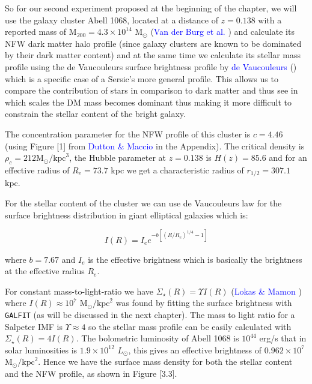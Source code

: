 So for our second experiment proposed at the beginning of the chapter, we will use the galaxy cluster Abell 1068, located at a distance of $z=0.138$ with a reported mass of $\text{M}_{200}=4.3\times 10^{14}$ $\text{M}_{\odot}$ (\textcolor{blue}{Van der Burg et al.} \citeyear{Reference2}) and calculate its NFW dark matter halo profile (since galaxy clusters are known to be dominated by their dark matter content) and at the same time we calculate its stellar mass profile using the de Vaucouleurs surface brightness profile by \textcolor{blue}{de Vaucouleurs} (\citeyear{Reference32}) which is a specific case of a Sersic's more general profile. This allows us to compare the contribution of stars in comparison to dark matter and thus see in which scales the DM mass becomes dominant thus making it more difficult to constrain the stellar content of the bright galaxy.

The concentration parameter for the NFW profile of this cluster is $c=4.46$ (using Figure [1] from \textcolor{blue}{Dutton \& Maccio} \citeyear{Reference23} in the Appendix). The critical density is $\rho_{c}=212\text{M}_{\odot}/\text{kpc}^{3}$, the Hubble parameter at $z=0.138$ is $H(z)=85.6$ and for an effective radius of $R_{e}=73.7$ kpc we get a characteristic radius of $r_{1/2}=307.1$ kpc.

For the stellar content of the cluster we can use de Vaucouleurs law for the surface brightness distribution in giant elliptical galaxies which is:

\begin{equation}
I(R)=I_{e}e^{-b\left[\left(R/R_{e}\right)^{1/4}-1\right]}
\end{equation}

where $b=7.67$ and $I_{e}$ is the effective brightness which is basically the brightness at the effective radius $R_{e}$.

For constant mass-to-light-ratio we have $\Sigma_{\star}(R)= \Upsilon I(R)$ (\textcolor{blue}{Lokas \& Mamon} \citeyear{Reference14}) where  $I(R)\approx 10^{7}$ $\text{M}_{\odot}/\text{kpc}^{2}$ was found by fitting the surface brightness with \texttt{GALFIT} (as will be discussed in the next chapter). The mass to light ratio for a Salpeter IMF is $\Upsilon\approx 4$ so the stellar mass profile can be easily calculated with  $\Sigma_{\star}(R)= 4I(R)$. The bolometric luminosity of Abell 1068 is $10^{44}$ erg/s that in solar luminosities is $1.9\times 10^{12}$ $L_{\odot}$, this gives an effective brightness of $0.962\times 10^{7}$ $\text{M}_{\odot}/\text{kpc}^2$. Hence we have the surface mass density for both the stellar content and the NFW profile, as shown in Figure [3.3].


